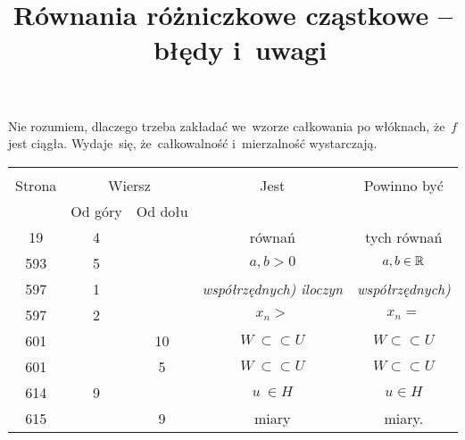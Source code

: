 \documentclass[a4paper,11pt]{article}
\title{Równania różniczkowe cząstkowe --~błędy i~uwagi}
\begin{document}



\maketitle  %





\start {} 

\start {} Nie rozumiem, dlaczego trzeba zakładać we~wzorze
całkowania po włóknach, że~$f$ jest ciągła. Wydaje~się,
że~całkowalność i~mierzalność wystarczają.


\begin{center}
  \begin{tabular}{|c|c|c|c|c|}
    \hline
    & \multicolumn{2}{c|}{} & & \\
    Strona & \multicolumn{2}{c|}{Wiersz} & Jest
                              & Powinno być \\ \cline{2-3}
    & Od góry & Od dołu & & \\
    \hline
    19  &  4 & & równań & tych równań \\
    593 &  5 & & $a, b > 0$ & $a, b \in \mathbb{R}$ \\
    597 &  1 & & \emph{współrzędnych) iloczyn} & \emph{współrzędnych)} \\
    597 &  2 & & $x_{ n } >$ & $x_{ n } =$ \\
    601 & & 10 & $W \: \subset \subset U$ & $W \subset \subset U$ \\
    601 & &  5 & $W \: \subset \subset U$ & $W \subset \subset U$ \\
    614 &  9 & & $u \: \in H$ & $u \in H$\\
    615 & &  9 & miary & miary. \\
    \hline
  \end{tabular}
\end{center}
\end{document}

